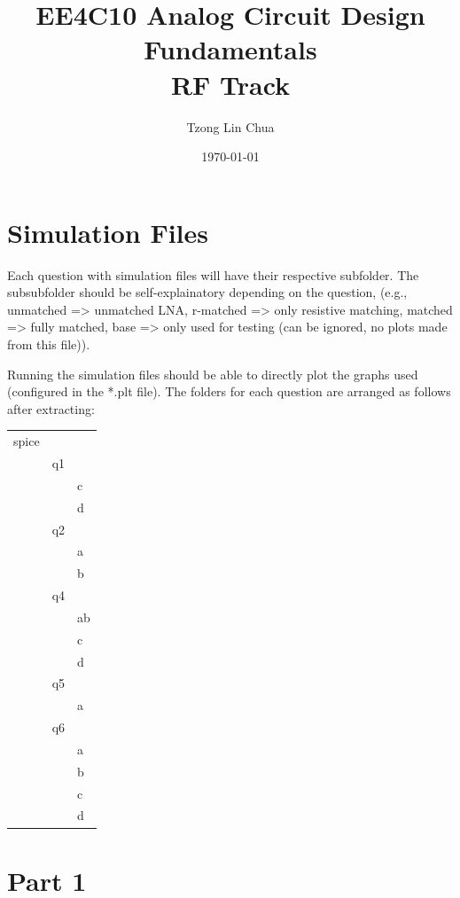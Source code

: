 \documentclass{article}
\author{Tzong Lin Chua}
\date{\today}
\title{EE4C10 Analog Circuit Design Fundamentals\\\medskip
\large RF Track }
\begin{document}
\maketitle
\tableofcontents


\section{Simulation Files}
\label{sec:org6b76779}
Each question with simulation files will have their respective subfolder. The subsubfolder should be self-explainatory
depending on the question, (e.g., unmatched => unmatched LNA, r-matched => only resistive matching, matched => fully matched,
base => only used for testing (can be ignored, no plots made from this file)).

Running the simulation files should be able to directly plot the graphs used (configured in the *.plt file).
The folders for each question are arranged as follows after extracting:

\begin{center}
\begin{tabular}{lll}
\hline
spice &  & \\
 & q1 & \\
 &  & c\\
 &  & d\\
 & q2 & \\
 &  & a\\
 &  & b\\
 & q4 & \\
 &  & ab\\
 &  & c\\
 &  & d\\
 & q5 & \\
 &  & a\\
 & q6 & \\
 &  & a\\
 &  & b\\
 &  & c\\
 &  & d\\
\hline
\end{tabular}
\end{center}
\section{Part 1}
\label{sec:org5e5a2ec}
\end{document}
